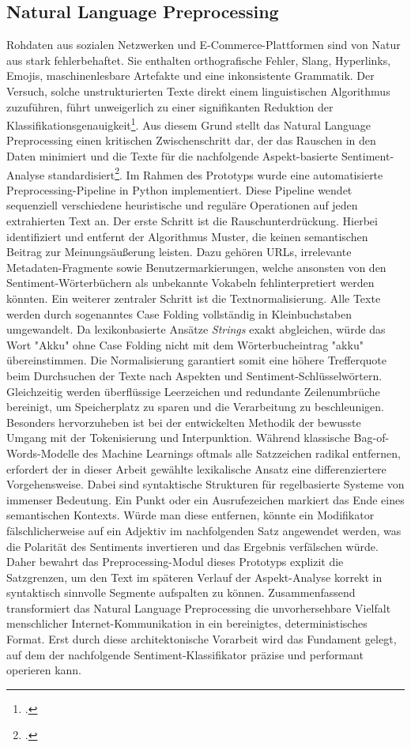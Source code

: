 \documentclass[12pt]{article}
\begin{document}
\subsection{Natural Language Preprocessing}
Rohdaten aus sozialen Netzwerken und E-Commerce-Plattformen sind von Natur aus stark fehlerbehaftet. Sie enthalten orthografische Fehler, Slang, Hyperlinks, Emojis, maschinenlesbare Artefakte und eine inkonsistente Grammatik. Der Versuch, solche unstrukturierten Texte direkt einem linguistischen Algorithmus zuzuführen, führt unweigerlich zu einer signifikanten Reduktion der Klassifikationsgenauigkeit\footcite[1]{kiritchenko-2014}. Aus diesem Grund stellt das Natural Language Preprocessing einen kritischen Zwischenschritt dar, der das Rauschen in den Daten minimiert und die Texte für die nachfolgende Aspekt-basierte Sentiment-Analyse standardisiert\footcite[1]{symeonidis-2018}.
Im Rahmen des Prototyps wurde eine automatisierte Preprocessing-Pipeline in Python implementiert. Diese Pipeline wendet sequenziell verschiedene heuristische und reguläre Operationen auf jeden extrahierten Text an. Der erste Schritt ist die Rauschunterdrückung. Hierbei identifiziert und entfernt der Algorithmus Muster, die keinen semantischen Beitrag zur Meinungsäußerung leisten. Dazu gehören URLs, irrelevante Metadaten-Fragmente sowie Benutzermarkierungen, welche ansonsten von den Sentiment-Wörterbüchern als unbekannte Vokabeln fehlinterpretiert werden könnten.
Ein weiterer zentraler Schritt ist die Textnormalisierung. Alle Texte werden durch sogenanntes Case Folding vollständig in Kleinbuchstaben umgewandelt. Da lexikonbasierte Ansätze \textit{Strings} exakt abgleichen, würde das Wort "Akku" ohne Case Folding nicht mit dem Wörterbucheintrag "akku" übereinstimmen. Die Normalisierung garantiert somit eine höhere Trefferquote beim Durchsuchen der Texte nach Aspekten und Sentiment-Schlüsselwörtern. Gleichzeitig werden überflüssige Leerzeichen und redundante Zeilenumbrüche bereinigt, um Speicherplatz zu sparen und die Verarbeitung zu beschleunigen.
Besonders hervorzuheben ist bei der entwickelten Methodik der bewusste Umgang mit der Tokenisierung und Interpunktion. Während klassische Bag-of-Words-Modelle des Machine Learnings oftmals alle Satzzeichen radikal entfernen, erfordert der in dieser Arbeit gewählte lexikalische Ansatz eine differenziertere Vorgehensweise. Dabei sind syntaktische Strukturen für regelbasierte Systeme von immenser Bedeutung. Ein Punkt oder ein Ausrufezeichen markiert das Ende eines semantischen Kontexts. Würde man diese entfernen, könnte ein Modifikator fälschlicherweise auf ein Adjektiv im nachfolgenden Satz angewendet werden, was die Polarität des Sentiments invertieren und das Ergebnis verfälschen würde. Daher bewahrt das Preprocessing-Modul dieses Prototyps explizit die Satzgrenzen, um den Text im späteren Verlauf der Aspekt-Analyse korrekt in syntaktisch sinnvolle Segmente aufspalten zu können.
Zusammenfassend transformiert das Natural Language Preprocessing die unvorhersehbare Vielfalt menschlicher Internet-Kommunikation in ein bereinigtes, deterministisches Format. Erst durch diese architektonische Vorarbeit wird das Fundament gelegt, auf dem der nachfolgende Sentiment-Klassifikator präzise und performant operieren kann.
\end{document}

